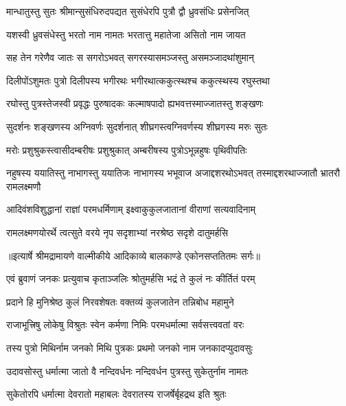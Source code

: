\twolineshloka
{मान्धातुस्तु सुतः श्रीमान्सुसंधिरुदपद्यत}
{सुसंधेरपि पुत्रौ द्वौ ध्रुवसंधिः प्रसेनजित्} %

\twolineshloka
{यशस्वी ध्रुवसंधेस्तु भरतो नाम नामतः}
{भरतात्तु महातेजा असितो नाम जायत} %

\twolineshloka
{सह तेन गरेणैव जातः स सगरोऽभवत्}
{सगरस्यासमञ्जस्तु असमञ्जादथांशुमान्} %

\twolineshloka
{दिलीपोंऽशुमतः पुत्रो दिलीपस्य भगीरथः}
{भगीरथात्ककुत्स्थश्च ककुत्स्थस्य रघुस्तथा} %

\twolineshloka
{रघोस्तु पुत्रस्तेजस्वी प्रवृद्धः पुरुषादकः}
{कल्माषपादो ह्यभवत्तस्माज्जातस्तु शङ्खणः} %

\twolineshloka
{सुदर्शनः शङ्खणस्य अग्निवर्णः सुदर्शनात्}
{शीघ्रगस्त्वग्निवर्णस्य शीघ्रगस्य मरुः सुतः} %

\twolineshloka
{मरोः प्रशुश्रुकस्त्वासीदम्बरीषः प्रशुश्रुकात्}
{अम्बरीषस्य पुत्रोऽभून्नहुषः पृथिवीपतिः} %

\threelineshloka
{नहुषस्य ययातिस्तु नाभागस्तु ययातिजः}
{नाभागस्य भभूवाज अजाद्दशरथोऽभवत्}
{तस्माद्दशरथाज्जातौ भ्रातरौ रामलक्ष्मणौ} %

\twolineshloka
{आदिवंशविशुद्धानां राज्ञां परमधर्मिणाम्}
{इक्ष्वाकुकुलजातानां वीराणां सत्यवादिनाम्} %

\twolineshloka
{रामलक्ष्मणयोरर्थे त्वत्सुते वरये नृप}
{सदृशाभ्यां नरश्रेष्ठ सदृशे दातुमर्हसि} %


{॥इत्यार्षे श्रीमद्रामायणे वाल्मीकीये आदिकाव्ये बालकाण्डे एकोनसप्ततितमः सर्गः॥}


\twolineshloka
{एवं ब्रुवाणं जनकः प्रत्युवाच कृताञ्जलिः}
{श्रोतुमर्हसि भद्रं ते कुलं नः कीर्तितं परम्} %

\twolineshloka
{प्रदाने हि मुनिश्रेष्ठ कुलं निरवशेषतः}
{वक्तव्यं कुलजातेन तन्निबोध महामुने} %

\twolineshloka
{राजाभूत्त्रिषु लोकेषु विश्रुतः स्वेन कर्मणा}
{निमिः परमधर्मात्मा सर्वसत्त्ववतां वरः} %

\twolineshloka
{तस्य पुत्रो मिथिर्नाम जनको मिथि पुत्रकः}
{प्रथमो जनको नाम जनकादप्युदावसुः} %

\twolineshloka
{उदावसोस्तु धर्मात्मा जातो वै नन्दिवर्धनः}
{नन्दिवर्धन पुत्रस्तु सुकेतुर्नाम नामतः} %

\twolineshloka
{सुकेतोरपि धर्मात्मा देवरातो महाबलः}
{देवरातस्य राजर्षेर्बृहद्रथ इति श्रुतः} %

